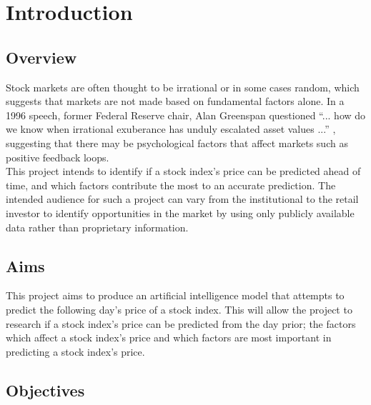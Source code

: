 \chapter{Introduction} \label{chap:introduction}

\section{Overview}

Stock markets are often thought to be irrational or in some cases random,
which suggests that markets are not made based on fundamental factors alone.
In a 1996 speech, former Federal Reserve chair, Alan Greenspan questioned ``... how do we know when irrational exuberance has unduly escalated asset
values ...'' \parencite{greenspan1996}, suggesting that there may be
psychological factors that affect markets such as positive feedback loops.\\

This project intends to identify if a stock index's price can be predicted ahead
of time, and which factors contribute the most to an accurate prediction.
The intended audience for such a project can vary from the institutional to
the retail investor to identify opportunities in the market by using only
publicly available data rather than proprietary information.

\section{Aims}

This project aims to produce an artificial intelligence model that
attempts to predict the following day's price of a stock index. This will
allow the project to research if a stock index's price can be predicted
from the day prior; the factors which affect a stock index's price and which
factors are most important in predicting a stock index's price.

\section{Objectives}

